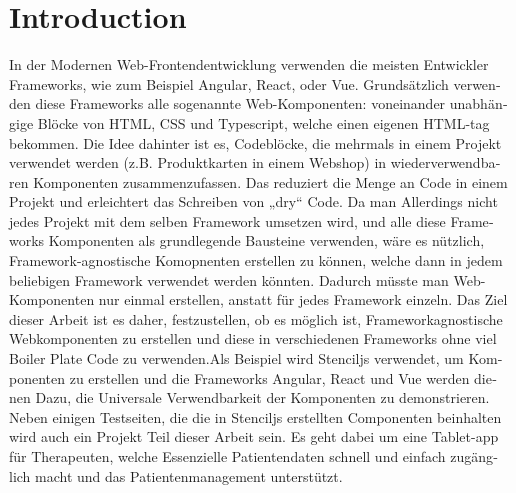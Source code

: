 \chapter{Introduction}

\begin{german}
In der Modernen Web-Frontendentwicklung verwenden die meisten Entwickler Frameworks, wie zum Beispiel Angular, React, oder Vue. Grundsätzlich verwenden diese Frameworks alle sogenannte Web-Komponenten:  voneinander unabhängige Blöcke von HTML, CSS und Typescript, welche einen eigenen HTML-tag bekommen. Die Idee dahinter ist es, Codeblöcke, die mehrmals in einem Projekt verwendet werden (z.B. Produktkarten in einem Webshop) in wiederverwendbaren Komponenten zusammenzufassen. Das reduziert die Menge an Code in einem Projekt und erleichtert das Schreiben von „dry“ Code.
Da man Allerdings nicht jedes Projekt mit dem selben Framework umsetzen wird, und alle diese Frameworks Komponenten als grundlegende Bausteine verwenden, wäre es nützlich, Framework-agnostische Komopnenten erstellen zu können, welche dann in jedem beliebigen Framework verwendet werden könnten. Dadurch müsste man Web-Komponenten nur einmal erstellen, anstatt für jedes Framework einzeln.
Das Ziel dieser Arbeit ist es daher, festzustellen, ob es möglich ist, Frameworkagnostische Webkomponenten zu erstellen und diese in verschiedenen Frameworks ohne viel Boiler Plate Code zu verwenden.Als Beispiel wird Stenciljs verwendet, um Komponenten zu erstellen und die Frameworks Angular, React und Vue werden dienen Dazu, die Universale Verwendbarkeit der Komponenten zu demonstrieren.
Neben einigen Testseiten, die die in Stenciljs erstellten Componenten beinhalten wird auch ein Projekt Teil dieser Arbeit sein. Es geht dabei um eine Tablet-app für Therapeuten, welche Essenzielle Patientendaten schnell und einfach zugänglich macht und das Patientenmanagement unterstützt.

\end{german}